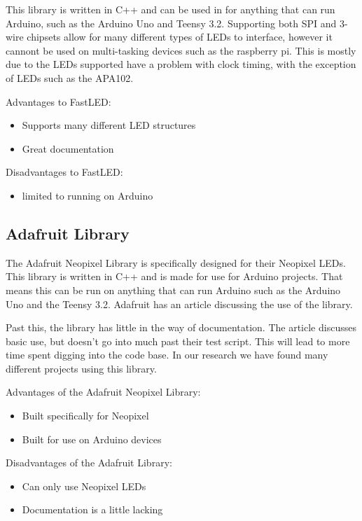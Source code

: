 	\vspace{5mm}
	\noindent This library is written in C++ and can be used in for anything
	that can run Arduino, such as the Arduino Uno and Teensy 3.2. Supporting
	both SPI and 3-wire chipsets allow for many different types of LEDs to
	interface, however it cannont be used on multi-tasking devices such as the
	raspberry pi. This is mostly due to the LEDs supported have a problem with
	clock timing, with the exception of LEDs such as the APA102.

	\vspace{5mm}
	\noindent Advantages to FastLED:
	\begin{itemize}
		\item Supports many different LED structures
		\item Great documentation
	\end{itemize}
	Disadvantages to FastLED:
	\begin{itemize}
		\item limited to running on Arduino
	\end{itemize}
	\subsection{Adafruit Library}
	\noindent The Adafruit Neopixel Library is specifically designed for their Neopixel
	LEDs. This library is written in C++ and is made for use for Arduino
	projects. That means this can be run on anything that can run Arduino such
	as the Arduino Uno and the Teensy 3.2. Adafruit has an article discussing
	the use of the library\cite[Pg 7]{neolib}.


	\vspace{5mm}
	\noindent Past this, the library has little in the way of documentation. The article
	discusses basic use, but doesn't go into much past their test script. This
	will lead to more time spent digging into the code base. In our research we
	have found many different projects using this library.

	\vspace{5mm}
	\noindent Advantages of the Adafruit Neopixel Library:
	\begin{itemize}
		\item Built specifically for Neopixel
		\item Built for use on Arduino devices
	\end{itemize}
	Disadvantages of the Adafruit Library:
	\begin{itemize}
		\item Can only use Neopixel LEDs
		\item Documentation is a little lacking
	\end{itemize}
